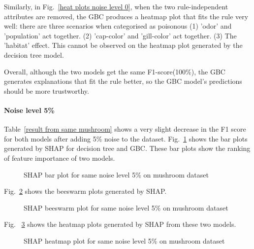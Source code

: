 \documentclass[runningheads,a4paper]{llncs}
\begin{document}
Similarly, in Fig.~\ref{heat plots noise level 0}, when the two rule-independent attributes are removed, the GBC produces a heatmap plot that fits the rule very well: there are three scenarios when categorised as poisonous (1) 'odor' and 'population' act together. (2) 'cap-color' and 'gill-color' act together. (3) The 'habitat' effect. This cannot be observed on the heatmap plot generated by the decision tree model.

Overall, although the two models get the same F1-score(100\%), the GBC generates explanations that fit the rule better, so the GBC model's predictions should be more trustworthy.
\paragraph{Noise level 5\%}
Table~\ref{result from same mushroom} shows a very slight decrease in the F1 score for both models after adding 5\% noise to the dataset.
Fig.~\ref{bar plots noise level 5} shows the bar plots generated by SHAP for decision tree and GBC. These bar plots show the ranking of feature importance of two models.
\begin{figure}[H]
	\centering
	
	\hfill
	
	
	\caption{SHAP bar plot for same noise level 5\% on mushroom dataset}
	\label{bar plots noise level 5}
\end{figure}

Fig.~\ref{bee plots noise level 5} shows the beeswarm plots generated by SHAP.
\begin{figure}[H]
	\centering
	
	\hfill
	
	
	\caption{SHAP beeswarm plot for same noise level 5\% on mushroom dataset}
	\label{bee plots noise level 5}
	
\end{figure}
Fig. ~\ref{heat plots noise level 5} shows the heatmap plots generated by SHAP from these two models.
\begin{figure}[H]
	\centering
	
	\hfill
	
	
	\caption{SHAP heatmap plot for same noise level 5\% on mushroom dataset}
	\label{heat plots noise level 5}
	
\end{figure}
\end{document}

